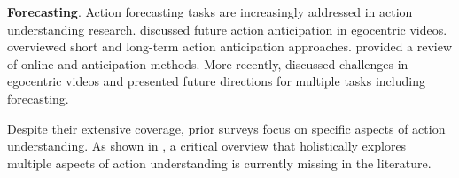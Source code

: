 \noindent
\textbf{Forecasting}. Action forecasting tasks are increasingly addressed in action understanding research. \citet{rodin2021predicting} discussed future action anticipation in egocentric videos. \citet{zhong2023survey} overviewed short and long-term action anticipation approaches. \citet{hu2022online} provided a review of online and anticipation methods. More recently, \citet{plizzari2024outlook} discussed challenges in egocentric videos and presented future directions for multiple tasks including forecasting.


  
Despite their extensive coverage, prior surveys focus on specific aspects of action understanding. As shown in , a critical overview that holistically explores multiple aspects of action understanding is currently missing in the literature. 



